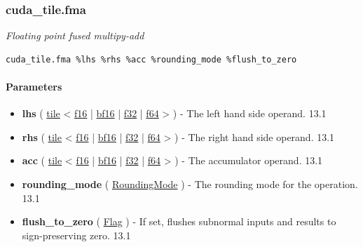 \documentclass{article}
\begin{document}
\subsubsection{cuda\_tile.fma}

\textit{Floating point fused multipy-add}


\begin{lstlisting}
cuda_tile.fma %lhs %rhs %acc %rounding_mode %flush_to_zero
\end{lstlisting}

\paragraph{Parameters}

\begin{itemize}
\item \textbf{lhs} ( \href{https://docs.nvidia.com/cuda/tile-ir/latest/sections/types.html#type-tile}{tile} < \href{https://docs.nvidia.com/cuda/tile-ir/latest/sections/types.html#subsection-element-types}{f16} | \href{https://docs.nvidia.com/cuda/tile-ir/latest/sections/types.html#subsection-element-types}{bf16} | \href{https://docs.nvidia.com/cuda/tile-ir/latest/sections/types.html#subsection-element-types}{f32} | \href{https://docs.nvidia.com/cuda/tile-ir/latest/sections/types.html#subsection-element-types}{f64} > ) - The left hand side operand. 13.1
\item \textbf{rhs} ( \href{https://docs.nvidia.com/cuda/tile-ir/latest/sections/types.html#type-tile}{tile} < \href{https://docs.nvidia.com/cuda/tile-ir/latest/sections/types.html#subsection-element-types}{f16} | \href{https://docs.nvidia.com/cuda/tile-ir/latest/sections/types.html#subsection-element-types}{bf16} | \href{https://docs.nvidia.com/cuda/tile-ir/latest/sections/types.html#subsection-element-types}{f32} | \href{https://docs.nvidia.com/cuda/tile-ir/latest/sections/types.html#subsection-element-types}{f64} > ) - The right hand side operand. 13.1
\item \textbf{acc} ( \href{https://docs.nvidia.com/cuda/tile-ir/latest/sections/types.html#type-tile}{tile} < \href{https://docs.nvidia.com/cuda/tile-ir/latest/sections/types.html#subsection-element-types}{f16} | \href{https://docs.nvidia.com/cuda/tile-ir/latest/sections/types.html#subsection-element-types}{bf16} | \href{https://docs.nvidia.com/cuda/tile-ir/latest/sections/types.html#subsection-element-types}{f32} | \href{https://docs.nvidia.com/cuda/tile-ir/latest/sections/types.html#subsection-element-types}{f64} > ) - The accumulator operand. 13.1
\item \textbf{rounding\_mode} ( \href{https://docs.nvidia.com/cuda/tile-ir/latest/sections/operations.html#op-attribute-cuda-tile-fma-roundingmode-attr}{RoundingMode} ) - The rounding mode for the operation. 13.1
\item \textbf{flush\_to\_zero} ( \href{https://docs.nvidia.com/cuda/tile-ir/latest/sections/operations.html#type-flag}{Flag} ) - If set, flushes subnormal inputs and results to sign-preserving zero. 13.1



\end{itemize}
\end{document}

